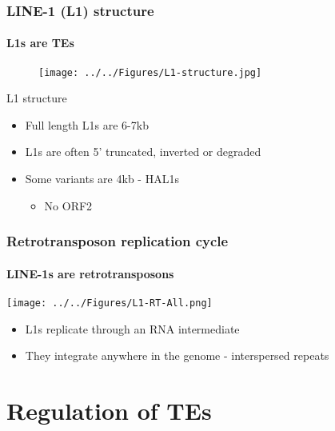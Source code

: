 \documentclass{beamer}
\begin{document}
		
		\begin{frame} %
			
			\frametitle{LINE-1 (L1) structure}
			\framesubtitle{L1s are TEs}
			
			\begin{figure}
				\texttt{[image: ../../Figures/L1-structure.jpg]}
			\end{figure}
			
			\begin{block}{L1 structure}
				\begin{itemize}
					\item Full length L1s are 6-7kb 
					\item L1s are often 5' truncated, inverted or degraded
					\item Some variants are 4kb - HAL1s
					\begin{itemize}
						\item No ORF2
					\end{itemize}
				\end{itemize}
				
			\end{block}
		\end{frame}
		
		\begin{frame} %
			
			\frametitle{Retrotransposon replication cycle}
			\framesubtitle{LINE-1s are retrotransposons}
			
			
			\hspace*{-1.1cm} \texttt{[image: ../../Figures/L1-RT-All.png]}
			\begin{itemize}
				\item L1s replicate through an RNA intermediate
				\item They integrate anywhere in the genome - interspersed repeats
			\end{itemize}
			
		\end{frame}
			
			\section[Regulation of TEs]{Regulation of TEs}
	
\end{document}
